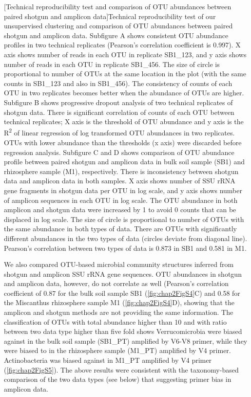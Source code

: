 \documentclass[]{msu-thesis}
\begin{document}
[Technical reproducibility test and comparison of OTU abundances between paired shotgun and amplicon data]{Technical reproducibility test of our unsupervised clustering and comparison of OTU abundances between paired shotgun and amplicon data. Subfigure A shows consistent OTU abundance profiles in two technical replicates (Pearson’s correlation coefficient is 0.997). X axis shows number of reads in each OTU in replicate SB1\_123, and y axis shows number of reads in each OTU in replicate SB1\_456. The size of circle is proportional to number of OTUs at the same location in the plot (with the same counts in SB1\_123 and also in SB1\_456).  The consistency of counts of each OTU in two replicates becomes better when the abundance of OTUs are higher. Subfigure B shows progressive dropout analysis of two technical replicates of shotgun data. There is significant correlation of counts of each OTU between technical replicates; X axis is the threshold of OTU abundance and y axis is the R\textsuperscript{2} of linear regression of log transformed OTU abundances in two replicates. OTUs with lower abundance than the thresholds (x axis) were discarded before regression analysis. Subfigure C and D shows comparison of OTU abundance profile between paired shotgun and amplicon data in bulk soil sample (SB1) and rhizosphere sample (M1), respectively. There is inconsistency between shotgun data and amplicon data in both samples. X axis shows number of SSU rRNA gene fragments in shotgun data per OTU in log scale, and y axis shows number of amplicon sequences in each OTU in log scale. The OTU abundance in both amplicon and shotgun data were increased by 1 to avoid 0 counts that can be displaced in log scale. The size of circle is proportional to number of OTUs with the same abundance in both types of data. There are OTUs with significantly different abundances in the two types of data (circles deviate from diagonal line). Pearson’s correlation between two types of data is 0.873 in SB1 and 0.581 in M1.}
\label{fig:chap2FigS4}
\DoubleSpacing
\bigskip

We also compared OTU-based microbial community structures inferred from shotgun and amplicon SSU rRNA gene sequences. OTU abundances in shotgun and amplicon data, however, do not correlate as well (Pearson’s correlation coefficient of 0.87 for the bulk soil sample SB1 (\cref{fig:chap2FigS4}C) and 0.58 for the Miscanthus rhizosphere sample M1 (\cref{fig:chap2FigS4}D), showing that the amplicon and shotgun methods are not providing the same information. The classification of OTUs with total abundance higher than 10 and with ratio between two data type higher than five fold shows Verrucomicrobia were biased against in the bulk soil sample (SB1\_PT) amplified by V6-V8 primer, while they were biased to in the rhizosphere sample (M1\_PT) amplified by V4 primer. Actinobacteria was biased against in M1\_PT amplified by V4 primer (\cref{fig:chap2FigS5}).  The above results were consistent with the taxonomy-based comparison of the two data types (see below) that suggesting primer bias in amplicon data.
\end{document}

